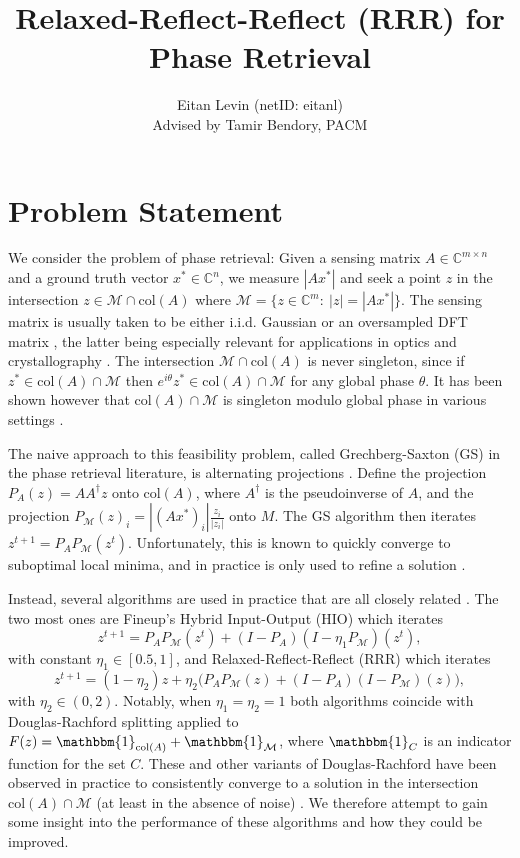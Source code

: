 \documentclass[12pt]{article}
\author{Eitan Levin (netID: eitanl)\\ Advised by Tamir Bendory, PACM}
\title{Relaxed-Reflect-Reflect (RRR) for Phase Retrieval}
\theoremstyle{definition}
\theoremstyle{remark}
\theoremstyle{definition}
\theoremstyle{problem}
\theoremstyle{definition}
\newcommand{\col}{\text{col}}
\newcommand{\CC}{\mathbb{C}}
\newcommand{\MM}{\mathcal{M}}
\begin{document}
\maketitle
\newpage
\section{Problem Statement}
We consider the problem of phase retrieval: Given a sensing matrix $A\in\CC^{m\times n}$ and a ground truth vector $x^*\in\CC^n$, we measure $|Ax^*|$ and seek a point $z$ in the intersection $z\in\MM\cap \col(A)$ where $\MM = \{z\in\CC^m:\ |z| = |Ax^*|\}$. The sensing matrix is usually taken to be either i.i.d. Gaussian or an oversampled DFT matrix \cite{Bendory2017}, the latter being especially relevant for applications in optics and crystallography \cite{Elser2017, Luke2005}. The intersection $\MM\cap\col(A)$ is never singleton, since if $z^*\in\col(A)\cap\MM$ then $e^{i\theta}z^*\in\col(A)\cap \MM$ for any global phase $\theta$. It has been shown however that $\col(A)\cap\MM$ is singleton modulo global phase in various settings \cite{Bandeira2014,Bendory2017,Conca2015}.

The naive approach to this feasibility problem, called Grechberg-Saxton (GS) in the phase retrieval literature, is alternating projections \cite{Elser2017}. Define the projection $P_A(z) = AA^{\dagger}z$ onto $\col(A)$, where $A^{\dagger}$ is the pseudoinverse of $A$, and the projection $P_{\MM}(z)_i = |(Ax^*)_i|\frac{z_i}{|z_i|}$ onto $M$. The GS algorithm then iterates $z^{t+1}=P_AP_{\MM}(z^t)$. Unfortunately, this is known to quickly converge to suboptimal local minima, and in practice is only used to refine a solution \cite{Elser2017, Marchesini2007}.

Instead, several algorithms are used in practice that are all closely related \cite{Marchesini2007, Elser2017}. The two most ones are Fineup's Hybrid Input-Output (HIO) \cite{Fienup1982} which iterates
\[z^{t+1} = P_AP_{\MM}(z^t) + (I-P_A)(I-\eta_1P_{\MM})(z^t),\] 
with constant $\eta_1\in[0.5,1]$, and Relaxed-Reflect-Reflect (RRR) \cite{Elser2017a,Elser2018} which iterates
\[z^{t+1} = (1-\eta_2)z + \eta_2\Big(P_AP_{\MM}(z) + (I-P_A)(I-P_{\MM})(z)\Big),\] 
with $\eta_2\in(0,2)$. 
Notably, when $\eta_1=\eta_2=1$ both algorithms coincide with Douglas-Rachford splitting applied to $F(z) = \mathbbm{1}_{\col(A)} + \mathbbm{1}_{\MM}$, where $\mathbbm{1}_C$ is an indicator function for the set $C$. These and other variants of Douglas-Rachford have been observed in practice to consistently converge to a solution in the intersection $\col(A)\cap \MM$ (at least in the absence of noise) \cite{Elser2017}. We therefore attempt to gain some insight into the performance of these algorithms and how they could be improved.
\end{document}
